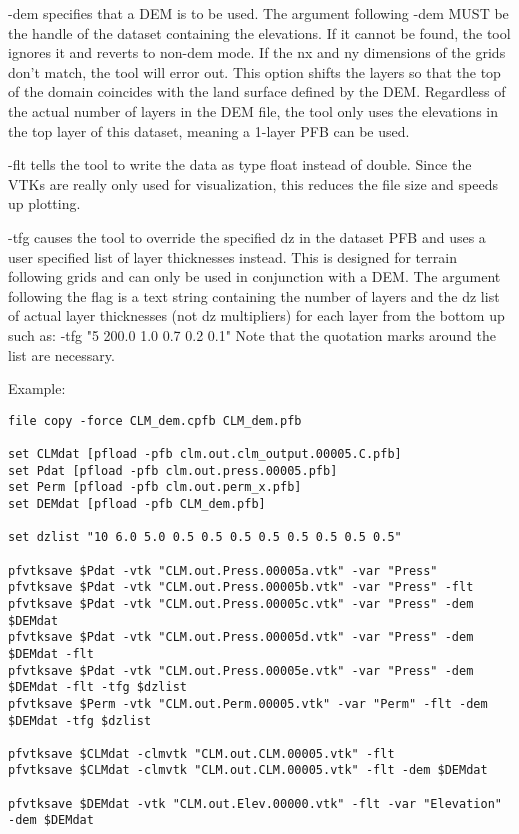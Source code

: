 \begin{description}
-dem specifies that a DEM is to be used. The argument following -dem MUST be the handle of the dataset containing the elevations. If it cannot be found, the tool ignores it and reverts to non-dem mode. If the nx and ny dimensions of the grids don’t match, the tool will error out. This option shifts the layers so that the top of the domain coincides with the land surface defined by the DEM. Regardless of the actual number of layers in the DEM file, the tool only uses the elevations in the top layer of this dataset, meaning a 1-layer PFB can be used.

-flt tells the tool to write the data as type float instead of double. Since the VTKs are really only used for visualization, this reduces the file size and speeds up plotting.

-tfg causes the tool to override the specified dz in the dataset PFB and uses a user specified list of layer thicknesses instead. This is designed for terrain following grids and can only be used in conjunction with a DEM. The argument following the flag is a text string containing the number of layers and the dz list of actual layer thicknesses (not dz multipliers) for each layer from the bottom up such as: -tfg "5 200.0 1.0 0.7 0.2 0.1"
Note that the quotation marks around the list are necessary.

Example:
\begin{display}
\begin{verbatim}
file copy -force CLM_dem.cpfb CLM_dem.pfb

set CLMdat [pfload -pfb clm.out.clm_output.00005.C.pfb]
set Pdat [pfload -pfb clm.out.press.00005.pfb]
set Perm [pfload -pfb clm.out.perm_x.pfb]
set DEMdat [pfload -pfb CLM_dem.pfb]

set dzlist "10 6.0 5.0 0.5 0.5 0.5 0.5 0.5 0.5 0.5 0.5"

pfvtksave $Pdat -vtk "CLM.out.Press.00005a.vtk" -var "Press"
pfvtksave $Pdat -vtk "CLM.out.Press.00005b.vtk" -var "Press" -flt
pfvtksave $Pdat -vtk "CLM.out.Press.00005c.vtk" -var "Press" -dem $DEMdat
pfvtksave $Pdat -vtk "CLM.out.Press.00005d.vtk" -var "Press" -dem $DEMdat -flt
pfvtksave $Pdat -vtk "CLM.out.Press.00005e.vtk" -var "Press" -dem $DEMdat -flt -tfg $dzlist
pfvtksave $Perm -vtk "CLM.out.Perm.00005.vtk" -var "Perm" -flt -dem $DEMdat -tfg $dzlist

pfvtksave $CLMdat -clmvtk "CLM.out.CLM.00005.vtk" -flt
pfvtksave $CLMdat -clmvtk "CLM.out.CLM.00005.vtk" -flt -dem $DEMdat

pfvtksave $DEMdat -vtk "CLM.out.Elev.00000.vtk" -flt -var "Elevation" -dem $DEMdat
\end{verbatim}\end{display}


\end{description}
